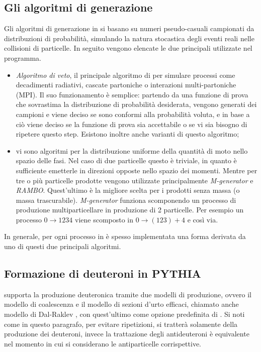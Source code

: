 
\subsection{Gli algoritmi di generazione}
Gli algoritmi di generazione in \pythiaa{} si basano su numeri pseudo-casuali campionati da distribuzioni di probabilità, simulando la natura stocastica degli eventi reali nelle collisioni di particelle.
In seguito vengono elencate le due principali utilizzate nel programma.
\begin{itemize}
    \item \emph{Algoritmo di veto}, il principale algoritmo di \pythiaa{} per simulare processi come decadimenti radiativi, cascate partoniche o interazioni multi-partoniche (MPI).
    Il suo funzionamento è semplice: partendo da una funzione di prova che sovrastima la distribuzione di probabilità desiderata, vengono generati dei campioni e viene deciso se sono conformi alla probabilità voluta, e in base a ciò viene deciso se la funzione di prova sia accettabile o se vi sia bisogno di ripetere questo step.
    Esistono inoltre anche varianti di questo algoritmo;
    \item vi sono algoritmi per la distribuzione uniforme della quantità di moto nello spazio delle fasi.
    Nel caso di due particelle questo è triviale, in quanto è sufficiente emetterle in direzioni opposte nello spazio dei momenti.
    Mentre per tre o più particelle prodotte vengono utilizzate principalmente \emph{M-generator} e \emph{RAMBO}.
    Quest'ultimo è la migliore scelta per i prodotti senza massa (o massa trascurabile).
    \textit{M-generator} funziona scomponendo un processo di produzione  multiparticellare in produzione di 2 particelle.
    Per esempio un processo $0\to1234$ viene scomposto in $0\to(123) + 4$ e così via.
\end{itemize}
In generale, per ogni processo in \pythiaa{} è spesso implementata una forma derivata da uno di questi due principali algoritmi.   

\subsection{Formazione di deuteroni in PYTHIA} \label{ch:pythia_deuteron}
\pythiaa{} supporta la produzione deuteronica tramite due modelli di produzione, ovvero il modello di coalescenza e il modello di sezioni d'urto efficaci, chiamato anche modello di Dal-Raklev \cite{Dal_2015}, con quest'ultimo come opzione predefinita di \pythiaa{}.
Si noti come in questo paragrafo, per evitare ripetizioni, si tratterà solamente della produzione dei deuteroni, invece la trattazione degli antideuteroni è equivalente nel momento in cui si considerano le antiparticelle corrispettive.

